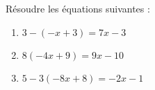 \documentclass[a4paper,11pt,exos]{nsi} %
\begin{document}
\maketitle

\begin{exercice}
    Résoudre les équations suivantes :
    \begin{multicols}{3}
        \begin{enumerate}
          
            \item $3-(-x+3)=7x-3$
			\item $8(-4x+9)=9x-10$
			\item $5-3(-8x+8)=-2x-1$
        \end{enumerate}
    \end{multicols}
    
\end{exercice}
\end{document}
